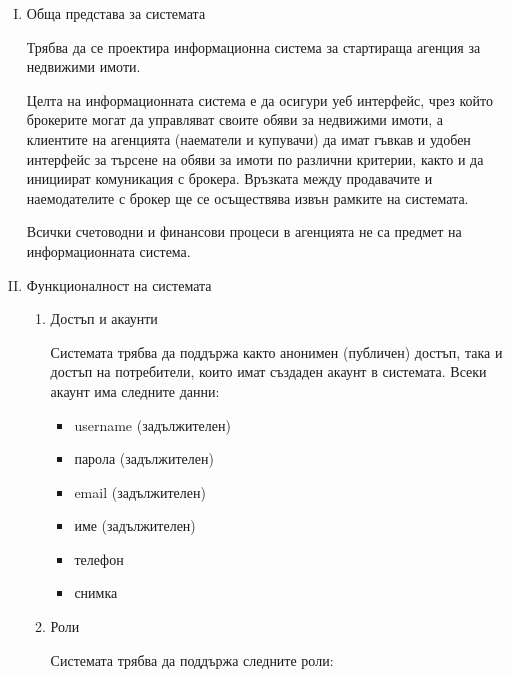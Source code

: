 \documentclass[]{article}
\begin{document}
\begin{enumerate}[I.]
	\item {Обща представа за системата
	
Трябва да се проектира информационна система за стартираща агенция за недвижими имоти.

Целта на информационната система е да осигури уеб интерфейс, чрез който брокерите могат да управляват своите обяви за недвижими имоти, а клиентите на агенцията (наематели и купувачи) да
имат гъвкав и удобен интерфейс за търсене на обяви за имоти по различни критерии, както и да инициират комуникация с брокера. Връзката между продавачите и наемодателите с брокер ще се осъществява извън рамките на системата.

Всички счетоводни и финансови процеси в агенцията не са предмет на информационната система.
	}
	
	\item {Функционалност на системата
		\begin{enumerate}[1.]
			\item {Достъп и акаунти

				Системата трябва да поддържа както анонимен (публичен) достъп, така и достъп на потребители, които имат създаден акаунт в системата. Всеки акаунт има следните данни:

				\begin{itemize}
					\item username (задължителен)
					\item парола (задължителен)
					\item email (задължителен)
					\item име (задължителен)
					\item телефон
					\item снимка
				\end{itemize}
			}
			\item {Роли			

				Системата трябва да поддържа следните роли:
	
}
\end{enumerate}}
\end{enumerate}
\end{document}
